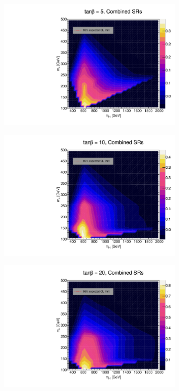 \documentclass[12pt, a4paper]{book}
\begin{document}
\begin{figure}[!ht]
\begin{subfigure}[b]{0.49\textwidth}
      \includegraphics[width=1\textwidth]{Limits/Model_independent/2HDM/2HDM_ll_tb5.pdf}
   \end{subfigure}
   \hfill
   \begin{subfigure}[b]{0.49\textwidth}
      \centering
      \includegraphics[width=1\textwidth]{Limits/Model_independent/2HDM/2HDM_ll_tb10.pdf}
   \end{subfigure}
   \hfill
	\begin{subfigure}[b]{0.49\textwidth}
      \centering
      \includegraphics[width=1\textwidth]{Limits/Model_independent/2HDM/2HDM_ll_tb20.pdf}

\end{subfigure}
\end{figure}
\end{document}

